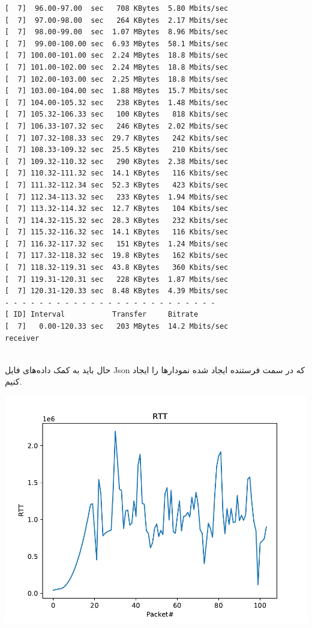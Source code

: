 \documentclass[12pt]{article}
\begin{document}
\begin{enumerate}
\begin{latin}
\begin{Verbatim}
[  7]  96.00-97.00  sec   708 KBytes  5.80 Mbits/sec                  
[  7]  97.00-98.00  sec   264 KBytes  2.17 Mbits/sec                  
[  7]  98.00-99.00  sec  1.07 MBytes  8.96 Mbits/sec                  
[  7]  99.00-100.00 sec  6.93 MBytes  58.1 Mbits/sec                  
[  7] 100.00-101.00 sec  2.24 MBytes  18.8 Mbits/sec                  
[  7] 101.00-102.00 sec  2.24 MBytes  18.8 Mbits/sec                  
[  7] 102.00-103.00 sec  2.25 MBytes  18.8 Mbits/sec                  
[  7] 103.00-104.00 sec  1.88 MBytes  15.7 Mbits/sec                  
[  7] 104.00-105.32 sec   238 KBytes  1.48 Mbits/sec                  
[  7] 105.32-106.33 sec   100 KBytes   818 Kbits/sec                  
[  7] 106.33-107.32 sec   246 KBytes  2.02 Mbits/sec                  
[  7] 107.32-108.33 sec  29.7 KBytes   242 Kbits/sec                  
[  7] 108.33-109.32 sec  25.5 KBytes   210 Kbits/sec                  
[  7] 109.32-110.32 sec   290 KBytes  2.38 Mbits/sec                  
[  7] 110.32-111.32 sec  14.1 KBytes   116 Kbits/sec                  
[  7] 111.32-112.34 sec  52.3 KBytes   423 Kbits/sec                  
[  7] 112.34-113.32 sec   233 KBytes  1.94 Mbits/sec                  
[  7] 113.32-114.32 sec  12.7 KBytes   104 Kbits/sec                  
[  7] 114.32-115.32 sec  28.3 KBytes   232 Kbits/sec                  
[  7] 115.32-116.32 sec  14.1 KBytes   116 Kbits/sec                  
[  7] 116.32-117.32 sec   151 KBytes  1.24 Mbits/sec                  
[  7] 117.32-118.32 sec  19.8 KBytes   162 Kbits/sec                  
[  7] 118.32-119.31 sec  43.8 KBytes   360 Kbits/sec                  
[  7] 119.31-120.31 sec   228 KBytes  1.87 Mbits/sec                  
[  7] 120.31-120.33 sec  8.48 KBytes  4.39 Mbits/sec                  
- - - - - - - - - - - - - - - - - - - - - - - - -
[ ID] Interval           Transfer     Bitrate
[  7]   0.00-120.33 sec   203 MBytes  14.2 Mbits/sec                  receiver


\end{Verbatim}
\end{latin}

حال باید به کمک داده‌های فایل Json که در سمت فرستنده ایجاد شده نمودارها را ایجاد کنیم.

\begin{center}
	\includegraphics[page=1, width = 0.6 \textwidth]{images/plots.pdf}
\end{center}


\end{enumerate}
\end{document}
